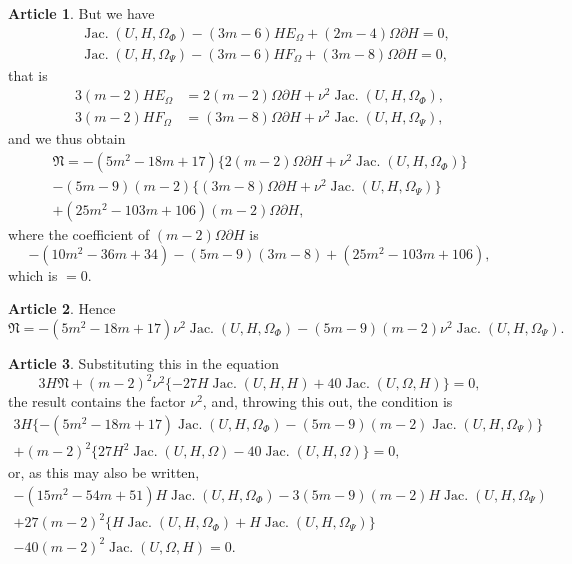 \documentclass[11pt,a4paper]{article}
\theoremstyle{definition}
\newtheorem{art}{Article}[section]
\DeclareMathOperator{\Jac}{Jac.}
\newcommand{\fN}{\mathfrak{N}}
\begin{document}
\begin{art}
But we have
\begin{align}
&\Jac(U, H, \Omega_\Phi) - (3m-6)H E_\Omega + (2m-4)\Omega \partial H = 0,
\tag{J} \\
&\Jac(U, H, \Omega_\Psi) - (3m-6)H F_\Omega + (3m-8)\Omega \partial H = 0,
\tag{J}
\end{align}
that is
\begin{align*}
3(m-2)H E_\Omega &= 2(m-2)\Omega \partial H + \nu^2 \Jac(U, H, \Omega_\Phi), \\
3(m-2)H F_\Omega &= (3m-8)\Omega \partial H + \nu^2 \Jac(U, H, \Omega_\Psi),
\end{align*}
and we thus obtain
\begin{multline*}
\fN = -(5m^2 - 18m + 17)\{2(m-2)\Omega \partial H
+ \nu^2 \Jac(U, H, \Omega_\Phi)\} \\
- (5m - 9)(m-2)\{(3m-8)\Omega \partial H + \nu^2 \Jac(U, H, \Omega_\Psi)\} \\
+ (25m^2 - 103m + 106)(m-2)\Omega \partial H,
\end{multline*}
where the coefficient of $(m-2)\Omega \partial H$ is
\[
-(10m^2 - 36m + 34) - (5m-9)(3m-8) + (25m^2 - 103m + 106),
\]
which is $=0$.
\end{art}

\begin{art}
Hence
\[
\fN = -(5m^2 - 18m + 17)\nu^2 \Jac(U, H, \Omega_\Phi)
- (5m - 9)(m-2)\nu^2 \Jac(U, H, \Omega_\Psi).
\]
\end{art}

\begin{art}
Substituting this in the equation
\[
3H\fN + (m-2)^2 \nu^2\{-27H\Jac(U, H, H) + 40\Jac(U, \Omega, H)\} = 0,
\]
the result contains the factor $\nu^2$, and, throwing this out, the condition is
\begin{multline*}
3H\{-(5m^2 - 18m + 17)\Jac(U, H, \Omega_\Phi)
- (5m-9)(m-2)\Jac(U, H, \Omega_\Psi)\} \\
+ (m-2)^2\{27H^2\Jac(U, H, \Omega) - 40\Jac(U, H, \Omega)\} = 0,
\end{multline*}
or, as this may also be written,
\begin{multline*}
-(15m^2 - 54m + 51)H\Jac(U, H, \Omega_\Phi)
- 3(5m-9)(m-2)H\Jac(U, H, \Omega_\Psi) \\
+ 27(m-2)^2\{H\Jac(U, H, \Omega_\Phi) + H\Jac(U, H, \Omega_\Psi)\} \\
- 40(m-2)^2 \Jac(U, \Omega, H) = 0.
\end{multline*}
\end{art}
\end{document}
